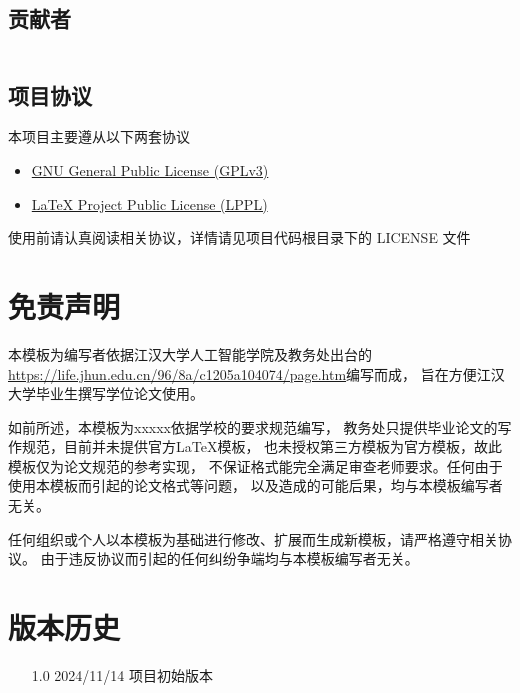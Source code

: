 \subsection{贡献者}
\begin{tabularx}{\textwidth}{@{\hspace{2em}}ll}
\end{tabularx}

\subsection{项目协议}
本项目主要遵从以下两套协议
\begin{itemize}
    \item \href{http://www.gnu.org/licenses/gpl.txt}
        {GNU General Public License (GPLv3)}
    \item \href{http://www.latex-project.org/lppl.txt}
        {\LaTeX{} Project Public License (LPPL)}
\end{itemize}
使用前请认真阅读相关协议，详情请见项目代码根目录下的 LICENSE 文件

\section{免责声明}
本模板为编写者依据江汉大学人工智能学院及教务处出台的
\href{《江汉大学本科生毕业设计（论文）规范化要求》}
{https://life.jhun.edu.cn/96/8a/c1205a104074/page.htm}编写而成，
旨在方便江汉大学毕业生撰写学位论文使用。

如前所述，本模板为xxxxx依据学校的要求规范编写，
教务处只提供毕业论文的写作规范，目前并未提供官方\LaTeX{}模板，
也未授权第三方模板为官方模板，故此模板仅为论文规范的参考实现，
不保证格式能完全满足审查老师要求。任何由于使用本模板而引起的论文格式等问题，
以及造成的可能后果，均与本模板编写者无关。

任何组织或个人以本模板为基础进行修改、扩展而生成新模板，请严格遵守相关协议。
由于违反协议而引起的任何纠纷争端均与本模板编写者无关。

\section{版本历史}
\begin{itemize}
    \item[1.0] 2024/11/14 项目初始版本
\end{itemize}
